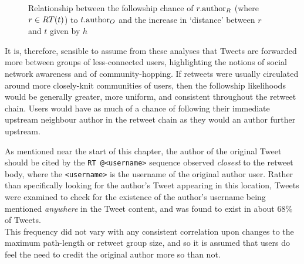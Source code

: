 \begin{figure}[h]
\centering
    \caption{Relationship between the followship chance of $r.\textrm{author}_R$ (where $r \in RT(t)$) to $t.\textrm{author}_O$ and the increase in `distance' between $r$ and $t$ given by $h$}
\label{fig:following-possibility}
\end{figure}



It is, therefore, sensible to assume from these analyses that Tweets are forwarded more between groups of less-connected users, highlighting the notions of social network awareness and of community-hopping. If retweets were usually circulated around more closely-knit communities of users, then the followship likelihoods would be generally greater, more uniform, and consistent throughout the retweet chain. Users would have as much of a chance of following their immediate upstream neighbour author in the retweet chain as they would an author further upstream.

As mentioned near the start of this chapter, the author of the original Tweet should be cited by the \texttt{RT @<username>} sequence observed \textit{closest} to the retweet body, where the \texttt{<username>} is the username of the original author user. Rather than specifically looking for the author's Tweet appearing in this location, Tweets were examined to check for the existence of the author's username being mentioned \textit{anywhere} in the Tweet content, and was found to exist in about 68\% of Tweets.\\
This frequency did not vary with any consistent correlation upon changes to the maximum path-length or retweet group size, and so it is assumed that users do feel the need to credit the original author more so than not. 

